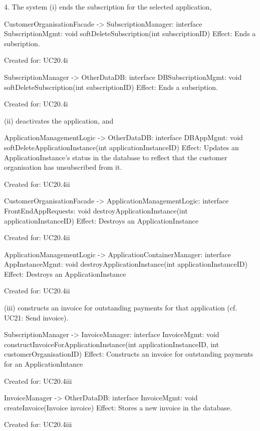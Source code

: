 {{{{{{{{{{{{{{        4. The system
           (i) ends the subscription for the selected application,

                CustomerOrganisationFacade -> SubscriptionManager: interface SubscriptionMgmt: void softDeleteSubscription(int subscriptionID)
                   Effect: Ends a subsription.
                   \item Created for: UC20.4i

                SubscriptionManager -> OtherDataDB: interface DBSubscriptionMgmt: void softDeleteSubscription(int subscriptionID)
                   Effect: Ends a subsription.
                    \item Created for: UC20.4i

            (ii) deactivates the application, and

                ApplicationManagementLogic -> OtherDataDB: interface DBAppMgmt: void softDeleteApplicationInstance(int applicationInstanceID)
                    Effect: Updates an ApplicationInstance's status in the database to reflect that the customer organisation has unsubscribed from it.
                    \item Created for: UC20.4ii

                CustomerOrganisationFacade -> ApplicationManagementLogic: interface FrontEndAppRequests: void destroyApplicationInstance(int applicationInstanceID)
                    Effect: Destroys an ApplicationInstance
                    \item Created for: UC20.4ii

                ApplicationManagementLogic -> ApplicationContainerManager: interface AppInstanceMgmt: void destroyApplicationInstance(int applicationInstanceID)
                    Effect: Destroys an ApplicationInstance
                    \item Created for: UC20.4ii

            (iii) constructs an invoice for outstanding payments for that application (cf. UC21: Send invoice).

                SubscriptionManager -> InvoiceManager: interface InvoiceMgmt: void constructInvoiceForApplicationInstance(int applicationInstanceID, int customerOrganisationID)
                    Effect: Constructs an invoice for outstanding payments for an ApplicationIntance
                    \item Created for: UC20.4iii

                InvoiceManager -> OtherDataDB: interface InvoiceMgmt: void createInvoice(Invoice invoice)
                    Effect: Stores a new invoice in the database.
                    \item Created for: UC20.4iii

}}}}}}}}}}}}}}
